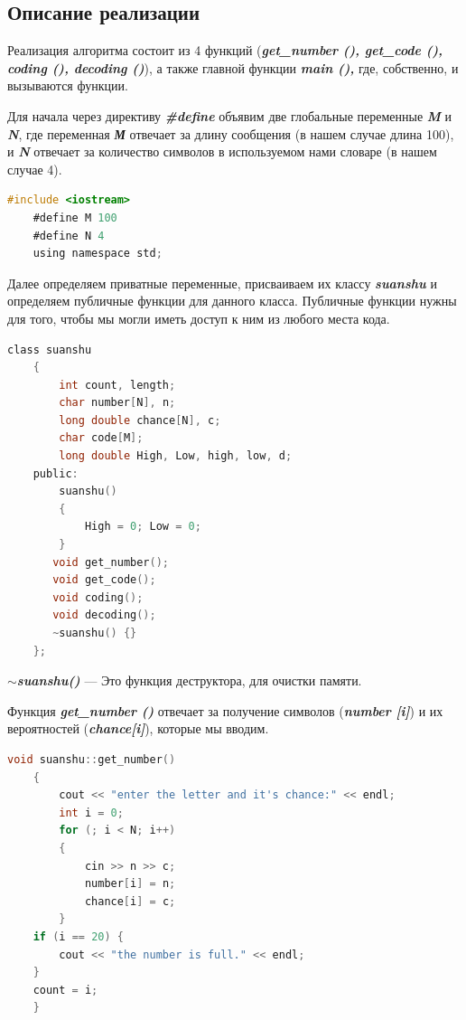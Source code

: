\documentclass[12pt]{article}
\begin{document}
\newpage

\begin{center}
    \section*{Описание реализации}
\end{center}

Реализация алгоритма состоит из 4 функций (\textbf{\textit{get\_number (), get\_code (), coding (), decoding ()}}), а также главной функции \textbf{\textit{main (), }}где, собственно, и вызываются функции.

Для начала через директиву \textbf{\textit{\#define}} объявим две глобальные переменные \textbf{\textit{M}} и \textbf{\textit{N}}, где переменная \textbf{\textit{М}} отвечает за длину сообщения (в нашем случае длина 100), и \textbf{\textit{N}} отвечает за количество символов в используемом нами словаре (в нашем случае 4).

\begin{lstlisting}[language=C,style=C]
    #include <iostream>
    #define M 100
    #define N 4
    using namespace std;

\end{lstlisting}

Далее определяем приватные переменные, присваиваем их классу \textbf{\textit{suanshu }}и определяем публичные функции для данного класса. Публичные функции нужны для того, чтобы мы могли иметь доступ к ним из любого места кода.

\begin{lstlisting}[language=C,style=C]
    class suanshu
    {
        int count, length;
        char number[N], n;
        long double chance[N], c;
        char code[M];
        long double High, Low, high, low, d;
    public:
        suanshu()
        {
            High = 0; Low = 0;
        }
	   void get_number();
	   void get_code();
	   void coding();
	   void decoding();
	   ~suanshu() {}
    };

\end{lstlisting}

\textbf{\textit{$\boldsymbol{\sim}$suanshu()}} --- Это функция деструктора, для очистки памяти.

Функция \textbf{\textit{get\_number ()}} отвечает за получение символов (\textbf{\textit{number [i]}}) и их вероятностей (\textbf{\textit{chance[i]}}), которые мы вводим.

\begin{lstlisting}[language=C,style=C]
    void suanshu::get_number()
    {
        cout << "enter the letter and it's chance:" << endl;
        int i = 0;
        for (; i < N; i++)
        {
            cin >> n >> c;
            number[i] = n;
            chance[i] = c;
        }
    if (i == 20) {
        cout << "the number is full." << endl;
    }
    count = i;
    }

\end{lstlisting}
\end{document}
